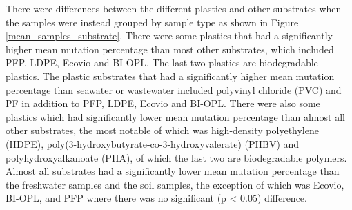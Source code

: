 There were differences between the different plastics and other substrates when the samples were instead grouped by sample type as shown in Figure \ref{mean_samples_substrate}.
There were some plastics that had a significantly higher mean mutation percentage than most other substrates, which included PFP, LDPE, Ecovio and BI-OPL. The last two plastics are biodegradable plastics.
The plastic substrates that had a significantly higher mean mutation percentage than seawater or wastewater included polyvinyl chloride (PVC) and PF in addition to PFP, LDPE, Ecovio and BI-OPL.
There were also some plastics which had significantly lower mean mutation percentage than almost all other substrates, the most notable of which was high-density polyethylene (HDPE), poly(3-hydroxybutyrate-co-3-hydroxyvalerate) (PHBV) and polyhydroxyalkanoate (PHA), of which the last two are biodegradable polymers.
Almost all substrates had a significantly lower mean mutation percentage than the freshwater samples and the soil samples, the exception of which was Ecovio, BI-OPL, and PFP where there was no significant (p < 0.05) difference. 


